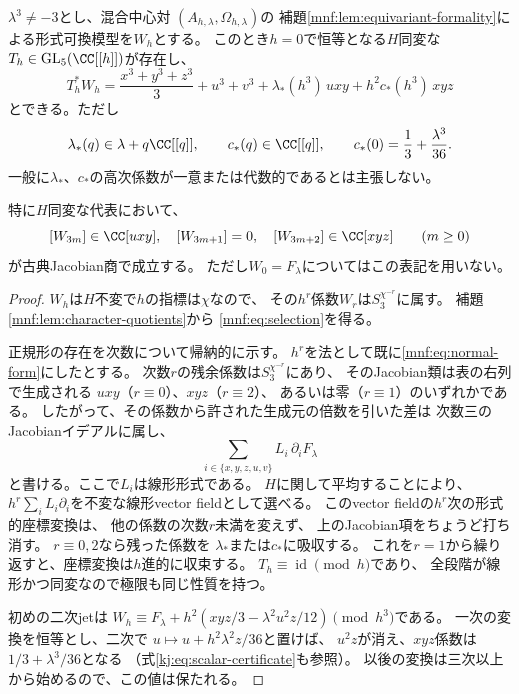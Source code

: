 \begin{theorem}[二形式級数による全次数正規形]
\label{mnf:thm:two-series}
$\lambda^3\ne-3$とし、混合中心対
$(A_{h,\lambda},\Omega_{h,\lambda})$の
補題\ref{mnf:lem:equivariant-formality}による形式可換模型を$W_h$とする。
このとき$h=0$で恒等となる$H$同変な
$T_h\in\operatorname{GL}_5(\CC[[h]])$が存在し、
\begin{equation}\label{mnf:eq:normal-form}
 T_h^*W_h=
 \frac{x^3+y^3+z^3}{3}+u^3+v^3+
 \lambda_*(h^3)\,uxy+h^2c_*(h^3)\,xyz
\end{equation}
とできる。ただし
\[
 \lambda_*(q)\in\lambda+q\CC[[q]],\qquad
 c_*(q)\in\CC[[q]],\qquad
 c_*(0)=\frac13+\frac{\lambda^3}{36}.
\]
一般に$\lambda_*$、$c_*$の高次係数が一意または代数的であるとは主張しない。

特に$H$同変な代表において、
\begin{equation}\label{mnf:eq:selection}
 [W_{3m}]\in\CC[uxy],\quad
 [W_{3m+1}]=0,\quad
 [W_{3m+2}]\in\CC[xyz]\qquad(m\ge0)
\end{equation}
が古典Jacobian商で成立する。
ただし$W_0=F_\lambda$についてはこの表記を用いない。
\end{theorem}
\begin{proof}
$W_h$は$H$不変で$h$の指標は$\chi$なので、
その$h^r$係数$W_r$は$S_3^{\chi^{-r}}$に属す。
補題\ref{mnf:lem:character-quotients}から
\eqref{mnf:eq:selection}を得る。

正規形の存在を次数について帰納的に示す。
$h^{r}$を法として既に\eqref{mnf:eq:normal-form}にしたとする。
次数$r$の残余係数は$S_3^{\chi^{-r}}$にあり、
そのJacobian類は表の右列で生成される
$uxy$（$r\equiv0$）、$xyz$（$r\equiv2$）、
あるいは零（$r\equiv1$）のいずれかである。
したがって、その係数から許された生成元の倍数を引いた差は
次数三のJacobianイデアルに属し、
\[
  \sum_{i\in\{x,y,z,u,v\}}L_i\,\partial_iF_\lambda
\]
と書ける。ここで$L_i$は線形形式である。
$H$に関して平均することにより、
$h^r\sum_iL_i\partial_i$を不変な線形vector fieldとして選べる。
このvector fieldの$h^r$次の形式的座標変換は、
他の係数の次数$r$未満を変えず、
上のJacobian項をちょうど打ち消す。
$r\equiv0,2$なら残った係数を
$\lambda_*$または$c_*$に吸収する。
これを$r=1$から繰り返すと、座標変換は$h$進的に収束する。
$T_h\equiv\operatorname{id}\pmod h$であり、
全段階が線形かつ同変なので極限も同じ性質を持つ。

初めの二次jetは
$W_h\equiv F_\lambda+
h^2(xyz/3-\lambda^2u^2z/12)\pmod{h^3}$である。
一次の変換を恒等とし、二次で
$u\mapsto u+h^2\lambda^2z/36$と置けば、
$u^2z$が消え、$xyz$係数は
$1/3+\lambda^3/36$となる
（式\eqref{kj:eq:scalar-certificate}も参照）。
以後の変換は三次以上から始めるので、この値は保たれる。
\end{proof}

